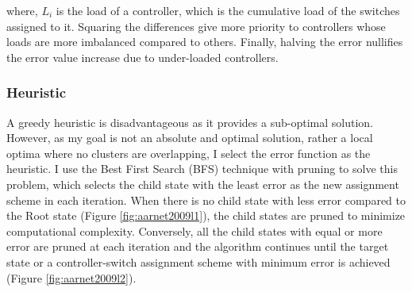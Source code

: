 \documentclass{IEEEtran}
\begin{document}
	where, $L_i$ is the load of a controller, which is the cumulative load of the switches assigned to it. Squaring the differences give more priority to controllers whose loads are more imbalanced compared to others. Finally, halving the error nullifies the error value increase due to under-loaded controllers.
	
	\subsubsection{Heuristic}
	A greedy heuristic is disadvantageous as it provides a sub-optimal solution. However, as my goal is not an absolute and optimal solution, rather a local optima where no clusters are overlapping, I select the error function as the heuristic. I use the Best First Search (BFS) technique with pruning to solve this problem, which selects the child state with the least error as the new assignment scheme in each iteration. When there is no child state with less error compared to the Root state (Figure \ref{fig:aarnet2009l1}), the child states are pruned to minimize computational complexity. Conversely, all the child states with equal or more error are pruned at each iteration and the algorithm continues until the target state or a controller-switch assignment scheme with minimum error is achieved  (Figure \ref{fig:aarnet2009l2}).
	
	\onecolumn
	
\end{document}
